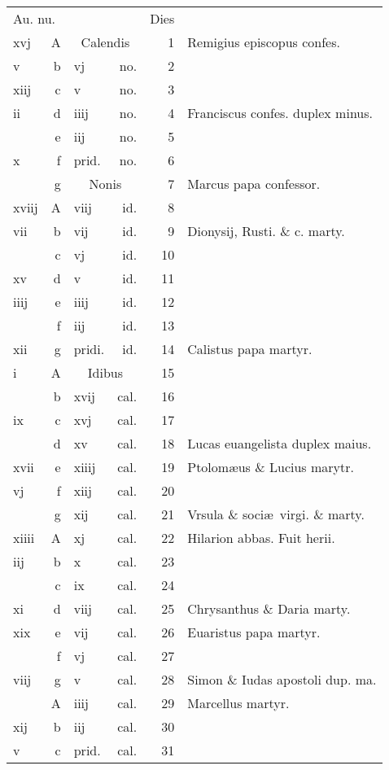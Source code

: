 \documentclass[a5paper,10pt]{book}
\def\ae{æ}
\begin{document}
\begin{center}
\begin{tabular}{l r l r r l}
\multicolumn{2}{l}{\color{red}Au. nu.} & & & \color{red} Dies & \\
xvj & \color{red} A & \multicolumn{2}{c}{\color{red} Calendis} & 1 & Remigius episcopus confes. \\
v & b & vj & no. & 2 & \\
xiij & c & v & no. & 3 & \\
ii & d & iiij & no. & 4 & \color{red} Franciscus confes. duplex minus. \color{black} \\
 & e & iij & no. & 5 & \\
x & f & \color{red} prid. & no. & 6 & \\
 & g & \multicolumn{2}{c}{\color{red} Nonis} & 7 & Marcus papa confessor. \color{black} \\
xviij & \color{red} A & viij & id. & 8 & \\
vii & b & vij & id. & 9 & Dionysij, Rusti. \& c. marty. \color{black} \\
 & c & vj & id. & 10 & \\
xv & d & v & id. & 11 & \\
iiij & e & iiij & id. & 12 & \\
 & f & iij & id. & 13 & \\
xii & g & \color{red} pridi. & id. & 14 & Calistus papa martyr. \\
i & \color{red} A & \multicolumn{2}{c}{\color{red} Idibus} & 15 & \\
 & b & xvij & cal. & 16 & \\
ix & c & xvj & cal. & 17 & \\
 & d & xv & cal. & 18 & \color{red} Lucas euangelista duplex maius. \color{black} \\
xvii & e & xiiij & cal. & 19 & Ptolom\ae us \& Lucius marytr. \color{black} \\
vj & f & xiij & cal. & 20 & \\
 & g & xij & cal. & 21 & Vrsula \& soci\ae \ virgi. \& marty. \\
xiiii & \color{red} A & xj & cal. & 22 & Hilarion abbas. \color{red} Fuit herii. \\%
iij & b & x & cal. & 23 & \\
 & c & ix & cal. & 24 & \\
xi & d & viij & cal. & 25 & Chrysanthus \& Daria marty. \\
xix & e & vij & cal. & 26 & Euaristus papa martyr. \\
 & f & vj & cal. & 27 & \\
viij & g & v & cal. & 28 & \color{red} Simon \& Iudas apostoli dup. ma. \color{black} \\
 & \color{red} A & iiij & cal. & 29 & Marcellus martyr. \color{black} \\
xij & b & iij & cal. & 30 & \\
v & c & \color{red} prid. & cal. & 31 & \\
\end{tabular}
\end{center}
\end{document}
